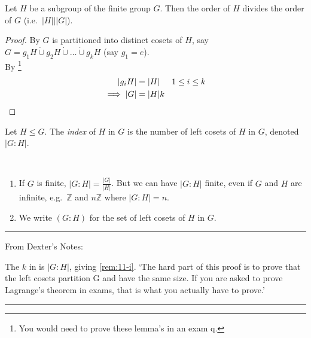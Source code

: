 \begin{theorem}
\protect\hypertarget{thm:three}{}\label{thm:three}
Let $H$ be a subgroup of the finite group $G$.
Then the order of $H$ divides the order of $G$ (i.e.~$|H| \mathbin{\bigg|} |G|$).
\end{theorem}

\begin{proof}
By  $G$ is partitioned into distinct cosets of $H$, say $G = g_1 H \mathbin{\dot{\cup}} g_2 H \mathbin{\dot{\cup}} \dots \mathbin{\dot{\cup}} g_k H$ (say $g_1 = e$).\\
By \footnote{You would need to prove these lemma's in an exam q.}
\begin{align*}
    |g_i H| &= |H| \hspace{.5cm} 1 \leq i \leq k \\
    \implies |G| &= |H|k
\end{align*}
\end{proof}

\begin{definition}
\protect\hypertarget{def:fourteen}{}\label{def:fourteen}
Let $H \leq G$.
The \emph{index} of $H$ in $G$ is the number of left cosets of $H$ in $G$, denoted $|G : H|$.
\end{definition}

\begin{remark} ~
    \begin{enumerate}
    \def\labelenumi{\roman{enumi}.}
    \item
    If $G$ is finite, $|G : H| = \frac{|G|}{|H|}$.
    But we can have $|G : H|$ finite, even if $G$ and $H$ are infinite, e.g.~$\mathbb{Z}$ and $n\mathbb{Z}$ where $|G : H| = n$. \label{rem:11-i}
    \item
    We write $(G : H)$ for the set of left cosets of $H$ in $G$.
    \end{enumerate}
\end{remark}

\begin{center}\rule{\linewidth}{0.5pt}\end{center}
From Dexter's Notes:

The $k$ in  is $| G : H |$, giving \cref{rem:11-i}.
`The hard part of this proof is to prove that the left cosets partition G
and have the same size. 
If you are asked to prove Lagrange’s theorem in exams,
that is what you actually have to prove.'
\begin{center}\rule{\linewidth}{0.5pt}\end{center}

